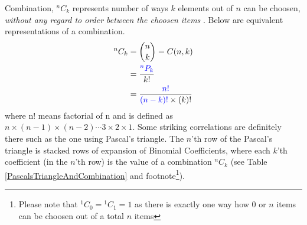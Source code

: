 \documentclass[10pt, twoside]{article}
\newcommand*{\Permutation}[2]{{}^{#1}P_{#2}}%
\newcommand*{\Combination}[2]{{}^{#1}C_{#2}}%
\begin{document}
	 	Combination, $\Combination{n}{k}$ represents number of ways $k$ elements out of $n$ can be choosen, \textit{without any regard to order between the choosen items} \cite{PrincTechCombinatorics}. Below are equivalent representations of a combination.
	\begin{align}
	\Combination{n}{k} &= \binom{n}{k} = C(n, k)  \\
					   &= \frac{\color{blue}\Permutation{n}{k}}{k!} \label{ConnectionBetweenPermutationAndCOmbination}\\	
					   &= \frac{\color{blue}n!}{{\color{blue}(n-k)!}\times(k)!} \label{FractionalDefinitionOfCombination}
	\end{align} 
	where n! means factorial of n and is defined as $n\times(n-1)\times(n-2)\cdots3\times2\times1$. Some striking correlations are definitely there such as the one using Pascal's triangle. The $n$'th  row of the Pascal's triangle \cite{wikipediaPascalTriangle} is stacked rows of expansion of Binomial Coefficients, where each $k$'th coefficient (in the $n$'th row) is the value of a combination $\Combination{n}{k}$ (see Table \ref{PascalsTriangleAndCombination} and footnote\footnote{Please note that $\Combination{1}{0}=\Combination{1}{1}=1$ as there is exactly one way how $0$ or $n$ items can be choosen out of a total $n$ items}).\newline
\end{document}
